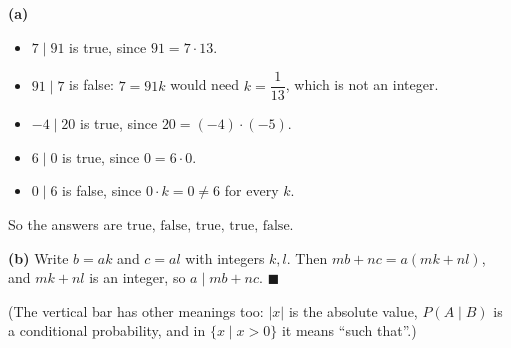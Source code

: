 \textbf{(a)}
\begin{itemize}
\item $7\mid91$ is true, since $91=7\cdot13$.
\item $91\mid7$ is false: $7=91k$ would need $k=\dfrac1{13}$, which is not an integer.
\item $-4\mid20$ is true, since $20=(-4)\cdot(-5)$.
\item $6\mid0$ is true, since $0=6\cdot0$.
\item $0\mid6$ is false, since $0\cdot k=0\ne6$ for every $k$.
\end{itemize}
So the answers are $\boxed{\text{true, false, true, true, false}}$.

\textbf{(b)} Write $b=ak$ and $c=al$ with integers $k,l$. Then $mb+nc=a(mk+nl)$, and $mk+nl$ is an integer, so $a\mid mb+nc$. $\blacksquare$

(The vertical bar has other meanings too: $|x|$ is the absolute value, $P(A\mid B)$ is a conditional probability, and in $\{x\mid x>0\}$ it means ``such that''.)
